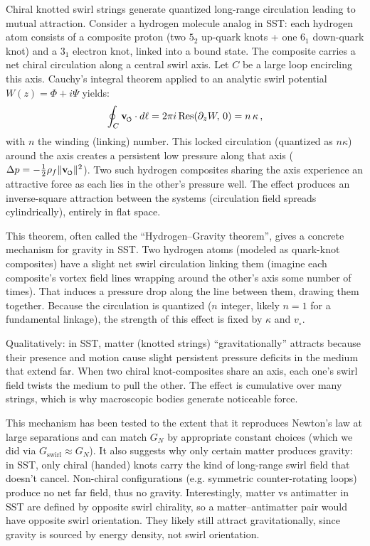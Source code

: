\documentclass[reprint,aps,onecolumn,nofootinbib]{revtex4-2}
\newcommand{\swirlarrow}{%
    \mathchoice{\mkern-2mu\scriptstyle\boldsymbol{\circlearrowleft}}%
    {\mkern-2mu\scriptstyle\boldsymbol{\circlearrowleft}}%
    {\mkern-2mu\scriptscriptstyle\boldsymbol{\circlearrowleft}}%
    {\mkern-2mu\scriptscriptstyle\boldsymbol{\circlearrowleft}}%
}
\newcommand{\vswirl}{\mathbf{v}_{\swirlarrow}}
\begin{document}
    \begin{tcolorbox}[title=Theorem 7.1: Hydrogen-Gravity Mechanism (Swirl Attraction in Flat Space)]
    Chiral knotted swirl strings generate quantized long-range circulation leading to mutual attraction. Consider a hydrogen molecule analog in SST: each hydrogen atom consists of a composite proton (two $5_2$ up-quark knots + one $6_1$ down-quark knot) and a $3_1$ electron knot, linked into a bound state. The composite carries a net chiral circulation along a central swirl axis. Let $C$ be a large loop encircling this axis. Cauchy’s integral theorem applied to an analytic swirl potential $W(z) = \Phi + i\Psi$ yields:
    \[
        \oint_C \vswirl \cdot d\ell = 2\pi i \,\text{Res}(\partial_z W,\,0) = n\,\kappa\,,
    \]
    with $n$ the winding (linking) number. This locked circulation (quantized as $n\kappa$) around the axis creates a persistent low pressure along that axis ($\Delta p = -\frac{1}{2}\rho_f \|\vswirl\|^2$). Two such hydrogen composites sharing the axis experience an attractive force as each lies in the other’s pressure well. The effect produces an inverse-square attraction between the systems (circulation field spreads cylindrically), entirely in flat space.
    \end{tcolorbox}

    \noindent This theorem, often called the “Hydrogen–Gravity theorem”, gives a concrete mechanism for gravity in SST. Two hydrogen atoms (modeled as quark-knot composites) have a slight net swirl circulation linking them (imagine each composite’s vortex field lines wrapping around the other’s axis some number of times). That induces a pressure drop along the line between them, drawing them together. Because the circulation is quantized ($n$ integer, likely $n=1$ for a fundamental linkage), the strength of this effect is fixed by $\kappa$ and $v_{\circ}$.

    Qualitatively: in SST, matter (knotted strings) “gravitationally” attracts because their presence and motion cause slight persistent pressure deficits in the medium that extend far. When two chiral knot-composites share an axis, each one’s swirl field twists the medium to pull the other. The effect is cumulative over many strings, which is why macroscopic bodies generate noticeable force.

    This mechanism has been tested to the extent that it reproduces Newton’s law at large separations and can match $G_N$ by appropriate constant choices (which we did via $G_{\text{swirl}}\approx G_N$). It also suggests why only certain matter produces gravity: in SST, only chiral (handed) knots carry the kind of long-range swirl field that doesn’t cancel. Non-chiral configurations (e.g. symmetric counter-rotating loops) produce no net far field, thus no gravity. Interestingly, matter vs antimatter in SST are defined by opposite swirl chirality, so a matter–antimatter pair would have opposite swirl orientation. They likely still attract gravitationally, since gravity is sourced by energy density, not swirl orientation.
\end{document}
